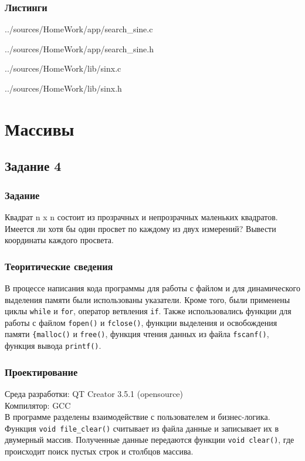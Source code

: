 \documentclass[12pt,a4paper]{report}
\begin{document}
\subsection*{Листинги}


{../sources/HomeWork/app/search_sine.c}


{../sources/HomeWork/app/search_sine.h}


{../sources/HomeWork/lib/sinx.c}


{../sources/HomeWork/lib/sinx.h}



\chapter{Массивы}
\section{Задание 4}
\subsection{Задание}
Квадрат n x n состоит из прозрачных и непрозрачных маленьких квадратов. Имеется ли хотя бы один просвет по каждому из двух измерений? Вывести координаты каждого просвета.

\subsection{Теоритические сведения}

В процессе написания кода программы для работы с файлом и для динамического выделения памяти были использованы указатели. Кроме того, были применены циклы \verb+while+ и \verb+for+, оператор ветвления \verb+if+. Также использовались функции для работы с файлом \verb+fopen()+ и \verb+fclose()+, функции выделения и освобождения памяти \verb+{malloc()+ и \verb+free()+, функция чтения данных из файла \verb+fscanf()+, функция вывода \verb+printf()+.

\subsection{Проектирование}
Среда разработки: QT Creator 3.5.1 (opensource)
\\
Компилятор: GCC
\\
В программе разделены взаимодействие с пользователем и бизнес-логика. Функция \verb+void file_clear()+ считывает из файла данные и записывает их в двумерный массив. Полученные данные передаются функции \verb+void clear()+, где происходит поиск пустых строк и столбцов массива.
\end{document}
